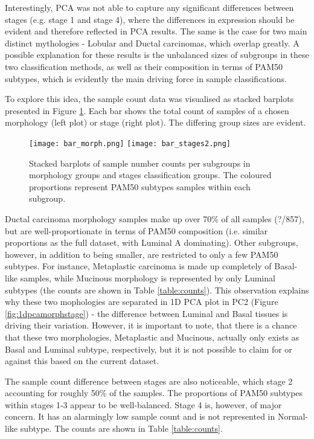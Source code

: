     
    \newpage
    Interestingly, PCA was not able to capture any significant differences between stages (e.g. stage 1 and stage 4), where the differences in expression should be evident and therefore reflected in PCA results. The same is the case for two main distinct mythologies - Lobular and Ductal carcinomas, which overlap greatly. A possible explanation for these results is the unbalanced sizes of subgroups in these two classification methods, as well as their composition in terms of PAM50 subtypes, which is evidently the main driving force in sample classifications. 
    
    To explore this idea, the sample count data was visualised as stacked barplots presented in Figure \ref{fig:barms}. Each bar shows the total count of samples of a chosen morphology (left plot) or stage (right plot). The differing group sizes are evident.         
    
       
        \begin{figure}[!h]
        \texttt{[image: bar\_morph.png]}\hfill
        \texttt{[image: bar\_stages2.png]}
        \caption{Stacked barplots of sample number counts per subgroups in morphology groups and stages classification groups. The coloured proportions represent PAM50 subtypes samples within each subgroup.}
        \label{fig:barms}
        \end{figure}
        
    Ductal carcinoma morphology samples make up over 70\% of all samples (?/857), but are well-proportionate in terms of PAM50 composition (i.e. similar proportions as the full dataset, with Luminal A dominating). Other subgroups, however, in addition to being smaller, are restricted to only a few PAM50 subtypes. For instance, Metaplastic carcinoma is made up completely of Basal-like samples, while Mucinous morphology is represented by only Luminal subtypes (the counts are shown in Table \ref{table:counts}). This observation explains why these two mophologies are separated in 1D PCA plot in PC2 (Figure \ref{fig:1dpcamorphstage}) - the difference between Luminal and Basal tissues is driving their variation. However, it is important to note, that there is a chance that these two morphologies, Metaplastic and Mucinous, actually only exists as Basal and Luminal subtype, respectively, but it is not possible to claim for or against this based on the current dataset.    
    
    The sample count difference between stages are also noticeable, which stage 2 accounting for roughly 50\% of the samples. The proportions of PAM50 subtypes within stages 1-3 appear to be well-balanced. Stage 4 is, however, of major concern. It has an alarmingly low sample count and is not represented in Normal-like subtype. The counts are shown in Table \ref{table:counts}.
        
